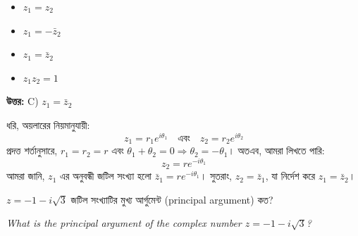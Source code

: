 \documentclass[12pt, a4paper]{article}
\begin{document}
\begin{itemize}[label={}, leftmargin=1cm, itemsep=0.5em]
    \item[\textbf{A)}] $z_1 = z_2$
    \item[\textbf{B)}] $z_1 = -\bar{z}_2$
    \item[\textbf{C)}] $z_1 = \bar{z}_2$
    \item[\textbf{D)}] $z_1 z_2 = 1$
\end{itemize}

\vspace{0.5em}
\begin{tcolorbox}[answerbox]
    \textbf{\color{success} উত্তর:} C) $z_1 = \bar{z}_2$
\end{tcolorbox}
\vspace{1em}

\begin{tcolorbox}[solutionbox={সমাধান (Solution)}]
    \noindent
    ধরি, অয়লারের নিয়মানুযায়ী:
    \[ z_1 = r_1 e^{i\theta_1} \quad \text{এবং} \quad z_2 = r_2 e^{i\theta_2} \]
    প্রদত্ত শর্তানুসারে, $r_1 = r_2 = r$ এবং $\theta_1 + \theta_2 = 0 \Rightarrow \theta_2 = -\theta_1$। 
    অতএব, আমরা লিখতে পারি:
    \[ z_2 = r e^{-i\theta_1} \]
    আমরা জানি, $z_1$ এর অনুবন্ধী জটিল সংখ্যা হলো $\bar{z}_1 = r e^{-i\theta_1}$। সুতরাং, $z_2 = \bar{z}_1$, যা নির্দেশ করে $z_1 = \bar{z}_2$।
\end{tcolorbox}

\vspace{1.5em}

\begin{tcolorbox}[questionbox={প্রশ্ন (Question) 22}]
    \noindent
    $z = -1 - i\sqrt{3}$ জটিল সংখ্যাটির মুখ্য আর্গুমেন্ট (principal argument) কত?
    
    \vspace{0.8em}
    \begin{english}
    \noindent\textit{\color{darkgray}
    What is the principal argument of the complex number $z = -1 - i\sqrt{3}$?
    }
    \end{english}
\end{tcolorbox}
\end{document}
